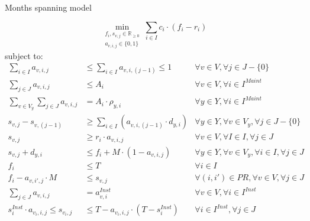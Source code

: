 \documentclass{beamer}
\newcommand{\smalld}{\tiny}
\begin{document}
\begin{frame}{Months spanning model}
\smalld

\begin{equation}
	\min_{\substack{f_i, s_{v,j} \in \mathbb{R}_{\geq 0} \\ 
	a_{v,i,j} \in \{0, 1\}}} 
	\sum_{i \in I} c_i \cdot (f_i - r_i)
\end{equation}
subject to:
\begin{align}
\sum_{i \in I} a_{v,i,j}							&\leq	\sum_{i \in I} a_{v,i,(j-1)}	\leq	1		&\forall v \in V, \forall j \in J - \{ 0 \}			\\
\sum_{j \in J} a_{v,i,j}							&\leq	A_i							&\forall v \in V,\forall i \in I^{Maint} 			\\
\sum_{v \in V_y} \sum_{j \in J} a_{v, i, j}				&=	A_i \cdot \rho_{y,i}  				& \forall y \in Y, \forall i \in I^{Maint} 			\\
s_{v,j} - s_{v,(j-1)}							&\geq	\sum_{i \in I} (a_{v,i,(j-1)} \cdot d_{y,i})	& \forall y \in Y, \forall v \in V_y, \forall j \in J - \{ 0 \}	\\
s_{v,j}									&\geq r_i \cdot a_{v,i,j} 					& \forall v \in V, \forall I \in I, \forall j \in J		\\
s_{v,j} + d_{y,i}								&\leq f_i + M \cdot (1 - a_{v,i,j})				& \forall y \in Y, \forall v \in V_y, \forall i \in I, \forall j \in J 	\\
f_i 										&\leq	T							& \forall i \in I 						\\
f_i - a_{v, i', j} \cdot M							&\leq s_{v,j}							& \forall (i, i') \in PR, \forall v \in V, \forall j \in J 	\\
\sum_{j \in J} a_{v,i,j}							&=	a^{Inst}_{v,i}					& \forall v \in V, \forall i \in I^{Inst}  			\\
s^{Inst}_i \cdot a_{v_i,i,j}	\leq	s_{v_i,j}			&\leq	T - a_{v_i,i,j} \cdot (T - s^{Inst}_i)		& \forall i \in I^{Inst}, \forall j \in J			
\end{align}

\end{frame}
\end{document}
